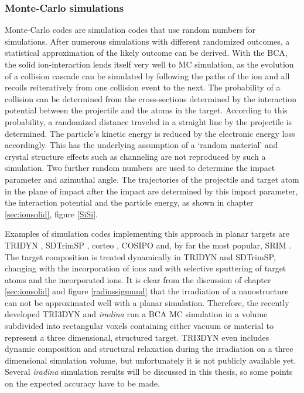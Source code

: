 \subsubsection{Monte-Carlo simulations}

Monte-Carlo codes are simulation codes that use random numbers for simulations. After numerous simulations with different randomized outcomes, a statistical approximation of the likely outcome can be derived. With the BCA, the solid ion-interaction lends itself very well to MC simulation, as the evolution of a collision cascade can be simulated by following the paths of the ion and all recoils reiteratively from one collision event to the next. The probability of a collision can be determined from the cross-sections determined by the interaction potential between the projectile and the atoms in the target. According to this probability, a randomized distance traveled in a straight line by the projectile is determined. The particle's kinetic energy is reduced by the electronic energy loss accordingly. This has the underlying assumption of a `random material' and crystal structure effects such as channeling are not reproduced by such a simulation. Two further random numbers are used to determine the impact parameter and azimuthal angle. The trajectories of the projectile and target atom in the plane of impact after the impact are determined by this impact parameter, the interaction potential and the particle energy, as shown in chapter \ref{sec:ionsolid}, figure \ref{SiSi}.

Examples of simulation codes implementing this approach in planar targets are TRIDYN \cite{moller_tridyn_1984}, SDTrimSP \cite{bizyukov_morphology_2008}, corteo \cite{schiettekatte_fast_2008}, COSIPO \cite{hautala_nuclear_1984} and, by far the most popular, SRIM \cite{ziegler_srim_2012}. The target composition is treated dynamically in TRIDYN and SDTrimSP, changing with the incorporation of ions and with selective sputtering of target atoms and the incorporated ions. It is clear from the discussion of chapter \ref{sec:ionsolid} and figure \ref{radiussigmund} that the irradiation of a nanostructure can not be approximated well with a planar simulation. Therefore, the recently developed TRI3DYN \cite{moller_tri3dyn_2014} and \emph{iradina} \cite{borschel_ion_2011} run a BCA MC simulation in a volume subdivided into rectangular voxels containing either vacuum or material to represent a three dimensional, structured target. TRI3DYN even includes dynamic composition and structural relaxation during the irradiation on a three dimensional simulation volume, but unfortunately it is not publicly available yet. Several \emph{iradina} simulation results will be discussed in this thesis, so some points on the expected accuracy have to be made. 

